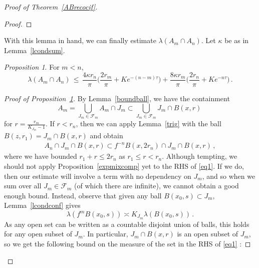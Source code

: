 \documentclass[11pt,reqno]{amsart}
\newcommand{\0}{\mathbf{0}}
\newtheorem{proposition}{Proposition}
\theoremstyle{remark}
\numberwithin{equation}{section}
\newtheorem{proposition}[theorem]{Proposition}
\theoremstyle{remark}
\numberwithin{equation}{section}
\begin{document}
\begin{proof}[Proof of Theorem~\ref{ABrecocif}]
\begin{proof}
    \end{proof}
    With this lemma in hand, we can finally estimate $\lambda(A_m \cap A_n)$. Let $\kappa$ be as in Lemma~\ref{lcondsum}.
    \begin{proposition}\label{measint}
        For $m < n$, 
        $$
        \lambda(A_m \cap A_n) \,  \leq \,  \frac{4\kappa r_n}{\pi}\big(\frac{2r_m}{\pi}+Ke^{-(n-m)\tau}\big) + \frac{8\kappa r_m}{\pi}\big(\frac{2r_n}{\pi}+Ke^{-n\tau} \big)\, .
        $$
    \end{proposition}
    \begin{proof}[Proof of Proposition~\ref{measint}]
    By Lemma~\ref{boundball}, we have the containment 
        $$
        A_m = \bigcup\limits_{J_m \in \mathcal{F}_m} A_m \cap J_m \subset \bigcup\limits_{J_m \in \mathcal{F}_m} J_m \cap B(x,r) \, 
        $$
        for $r= \frac{r_m}{K_{J_m}-1}$.
If $r< r_n$, then we can apply Lemma~\ref{trig} with the ball $B(z,r_1)=J_m \cap B(x,r)$ and obtain 
\begin{eqnarray}\label{eq1}
    A_n \cap J_m \cap B(x,r) \subset f^{-n}B(x,2r_n)  \cap J_m \cap B(x,r) \, , 
\end{eqnarray}
where we have bounded $r_1+r \leq 2r_n$ as $r_1\leq r< r_n$.
Although tempting, we should not apply Proposition~\ref{expmixcomp} yet to the RHS of \eqref{eq1}. If we do, then our estimate will involve a term with no dependency on $J_m$, and so when we sum over all  $J_m \in \mathcal{F}_m$ (of which there are infinite), we cannot obtain a good enough bound. 
Instead, observe that given any ball $B(x_0,s) \subset J_m$, Lemma~\ref{lcondconf} gives
$$
\lambda(f^mB(x_0,s)) \asymp K_{J_m}\lambda(B(x_0,s)) \, .
$$
As any open set can be written as a countable disjoint union of balls, this holds for any open subset of $J_m$. In particular, $J_m \cap B(x,r)$ is an open subset of $ J_m$, so we get the following bound on the measure of the set in the RHS of \eqref{eq1} :


\end{proof}
\end{proof}
\end{document}
